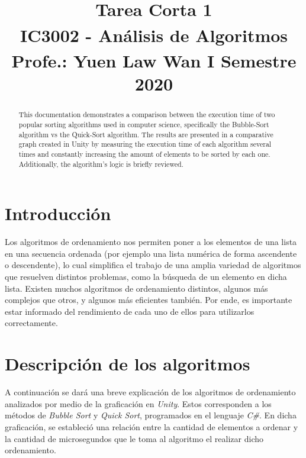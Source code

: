 \documentclass[conference]{IEEEtran}
\begin{document}
\title{Tarea Corta 1\\
{\footnotesize \textsuperscript{}IC3002 - Análisis de Algoritmos}
{\footnotesize \textsuperscript{}Profe.: Yuen Law Wan}
{\footnotesize \textsuperscript{}I Semestre 2020}
}

\author{
\and
{}
}

\maketitle

\begin{abstract}
This documentation demonstrates a comparison between the execution time of two popular sorting algorithms used in computer science, specifically the Bubble-Sort algorithm vs the Quick-Sort algorithm. The results are presented in a comparative graph created in Unity by measuring the execution time of each algorithm several times and constantly increasing the amount of elements to be sorted by each one. Additionally, the algorithm’s logic is briefly reviewed. 
\end{abstract}


\section{Introducción}
Los algoritmos de ordenamiento nos permiten poner a los elementos de una lista en una secuencia ordenada (por ejemplo una lista numérica de forma ascendente o descendente), lo cual simplifica el trabajo de una amplia variedad de algoritmos que resuelven distintos problemas, como la búsqueda de un elemento en dicha lista. Existen muchos algoritmos de ordenamiento distintos, algunos más complejos que otros, y algunos más eficientes también. Por ende, es importante estar informado del rendimiento de cada uno de ellos para utilizarlos correctamente. 

\section{Descripción de los algoritmos}
A continuación se dará una breve explicación de los algoritmos de ordenamiento analizados por medio
de la graficación en \textit{Unity}. Estos corresponden a los métodos de \textit{Bubble Sort} y \textit{Quick Sort}, programados
en el lenguaje \textit{C\#}. En dicha graficación, se estableció una relación entre la cantidad de elementos a ordenar y
 la cantidad de microsegundos que le toma al algoritmo el realizar dicho ordenamiento. 
\end{document}
